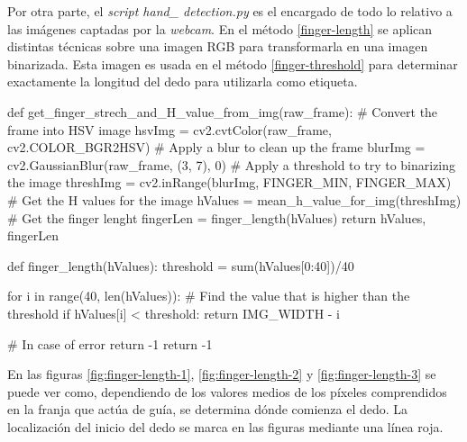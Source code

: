 Por otra parte, el \textit{script hand\_ detection.py} es el encargado de todo lo relativo a las imágenes
captadas por la \textit{webcam}. En el método \ref{finger-length} se aplican distintas técnicas sobre una imagen
RGB para transformarla en una imagen binarizada. Esta imagen es usada en el método \ref{finger-threshold} para
determinar exactamente la longitud del dedo para utilizarla como etiqueta.

\begin{python}[frame=none, numbers=left, label={finger-length},
caption={Este método aplica diversos tratamientos
sobre la imagen para obtener la etiqueta de longitud. Primero se cambia el espectro de color a HSV (línea 3)
\cite{hsv}, se aplica un desenfoque gaussiano (l. 5)\cite{gaussian-blur}. Una vez realizado se aplica a la
imagen un filtro usando un rango de valores (l.7) para obtener la etiqueta de longitud para esa imagen determinada
(l. 11)  }]
def get_finger_strech_and_H_value_from_img(raw_frame):
    # Convert the frame into HSV image
    hsvImg = cv2.cvtColor(raw_frame, cv2.COLOR_BGR2HSV)
    # Apply a blur to clean up the frame
    blurImg = cv2.GaussianBlur(raw_frame, (3, 7), 0)
    # Apply a threshold to try to binarizing the image
    threshImg = cv2.inRange(blurImg, FINGER_MIN, FINGER_MAX)
    # Get the H values for the image
    hValues = mean_h_value_for_img(threshImg)
    # Get the finger lenght
    fingerLen = finger_length(hValues)
    return hValues, fingerLen
\end{python}


\begin{python}[frame=none, numbers=left,label={finger-threshold}, caption={Función que determina en que punto de la empieza el dedo.
Se calcula un límite con el valor de los primeros 40 píxeles que pertenecen al fondo (línea 3), cuando el valor
de la imagen varía significativamente (l. 7) se ha localizado el inicio del dedo (l. 8), y por tanto su longiutd.}]
def finger_length(hValues):
    threshold = sum(hValues[0:40])/40

    for i in range(40, len(hValues)):
        # Find the value that is higher than the threshold
        if hValues[i] < threshold:
            return IMG_WIDTH - i

    # In case of error return -1
    return -1
\end{python}

En las figuras \ref{fig:finger-length-1}, \ref{fig:finger-length-2} y \ref{fig:finger-length-3} se puede ver como, dependiendo de los valores medios de los píxeles comprendidos en la franja que actúa de guía, se determina dónde comienza el dedo. La localización del inicio del dedo se marca en las figuras mediante una línea roja.

